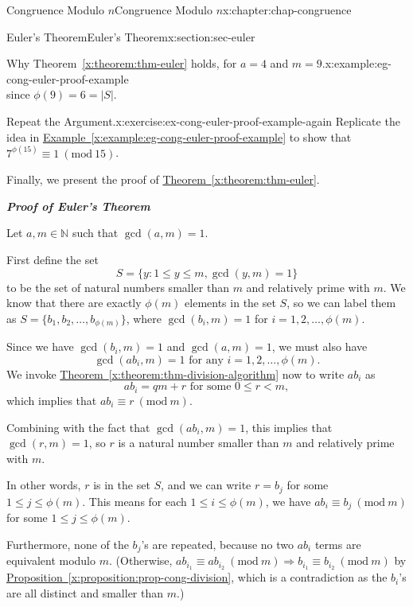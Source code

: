 \documentclass[oneside,10pt,]{book}
\newcommand{\xreffont}{\relax}
\newcommand{\alert}[1]{\textbf{\textit{#1}}}
\numberwithin{equation}{section}
\newcommand{\Mod}[1]{\ \left(\mathrm{mod}\ #1\right)}
\newcommand{\lt}{<}
\begin{document}
\begin{chapterptx}{Congruence Modulo \(n\)}{}{Congruence Modulo \(n\)}{}{}{x:chapter:chap-congruence}
\begin{sectionptx}{Euler's Theorem}{}{Euler's Theorem}{}{}{x:section:sec-euler}
\begin{example}{Why Theorem~{\xreffont\ref*{x:theorem:thm-euler}} holds, for \(a = 4\) and \(m = 9\).}{x:example:eg-cong-euler-proof-example}
\begin{equation*}
\end{equation*}
since \(\phi(9) = 6 = |S|\).%
\end{example}
\begin{inlineexercise}{Repeat the Argument.}{x:exercise:ex-cong-euler-proof-example-again}%
Replicate the idea in \hyperref[x:example:eg-cong-euler-proof-example]{Example~{\xreffont\ref{x:example:eg-cong-euler-proof-example}}} to show that \(7^{\phi(15)} \equiv 1 \Mod{15}\).%
\end{inlineexercise}
Finally, we present the proof of \hyperref[x:theorem:thm-euler]{Theorem~{\xreffont\ref{x:theorem:thm-euler}}}.%
\par
\alert{Proof of Euler's Theorem}%
\par
Let \(a,m \in \mathbb{N}\) such that \(\gcd(a,m) = 1\).%
\par
First define the set%
\begin{equation*}
S = \{y : 1 \leq y \leq m, \gcd(y,m) = 1\}
\end{equation*}
to be the set of natural numbers smaller than \(m\) and relatively prime with \(m\). We know that there are exactly \(\phi(m)\) elements in the set \(S\), so we can label them as \(S = \{b_1,b_2,\ldots,b_{\phi(m)}\}\), where \(\gcd(b_i,m) = 1\) for \(i = 1,2,\ldots,\phi(m)\).%
\par
Since we have \(\gcd(b_i,m) = 1\) and \(\gcd(a,m) = 1\), we must also have%
\begin{equation*}
\gcd(ab_i, m) = 1 \text{ for any } i = 1,2,\ldots,\phi(m)\text{.}
\end{equation*}
We invoke \hyperref[x:theorem:thm-division-algorithm]{Theorem~{\xreffont\ref{x:theorem:thm-division-algorithm}}} now to write \(ab_i\) as%
\begin{equation*}
ab_i = qm + r \text{ for some } 0 \leq r \lt m,
\end{equation*}
which implies that \(ab_i \equiv r \Mod{m}\).%
\par
Combining with the fact that \(\gcd(ab_i,m) = 1\), this implies that \(\gcd(r,m) = 1\), so \(r\) is a natural number smaller than \(m\) and relatively prime with \(m\).%
\par
In other words, \(r\) is in the set \(S\), and we can write \(r = b_j\) for some \(1 \leq j \leq \phi(m)\). This means for each \(1 \leq i \leq \phi(m)\), we have \(ab_i \equiv b_j \Mod{m}\) for some \(1 \leq j \leq \phi(m)\).%
\par
Furthermore, none of the \(b_j\)'s are repeated, because no two \(ab_i\) terms are equivalent modulo \(m\). (Otherwise, \(ab_{i_1} \equiv ab_{i_2} \Mod{m} \Rightarrow b_{i_1} \equiv b_{i_2} \Mod{m}\) by \hyperref[x:proposition:prop-cong-division]{Proposition~{\xreffont\ref{x:proposition:prop-cong-division}}}, which is a contradiction as the \(b_i\)'s are all distinct and smaller than \(m\).)%

\end{sectionptx}
\end{chapterptx}
\end{document}
